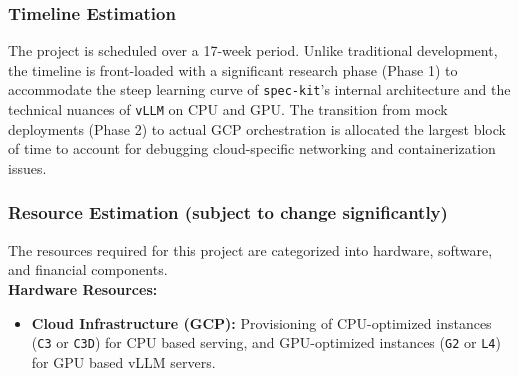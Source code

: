 \documentclass[a4paper,12pt]{report}
\begin{document}
\subsubsection{Timeline Estimation}
The project is scheduled over a 17-week period. Unlike traditional development, the timeline is front-loaded with a significant research phase (Phase 1) to accommodate the steep learning curve of \texttt{spec-kit}'s internal architecture and the technical nuances of \texttt{vLLM} on CPU and GPU. The transition from mock deployments (Phase 2) to actual GCP orchestration is allocated the largest block of time to account for debugging cloud-specific networking and containerization issues.

\begin{table}[h!]
\centering
\caption{Project Milestone Timeline}
\label{table:timeline}
\end{table}

\newpage

\subsubsection{Resource Estimation (subject to change significantly)}
The resources required for this project are categorized into hardware, software, and financial components.\\

\textbf{Hardware Resources:}
\begin{itemize}
    \item \textbf{Cloud Infrastructure (GCP):} Provisioning of CPU-optimized instances (\texttt{C3} or \texttt{C3D}) for CPU based serving, and GPU-optimized instances (\texttt{G2} or \texttt{L4}) for GPU based vLLM servers.
\end{itemize}
\end{document}
